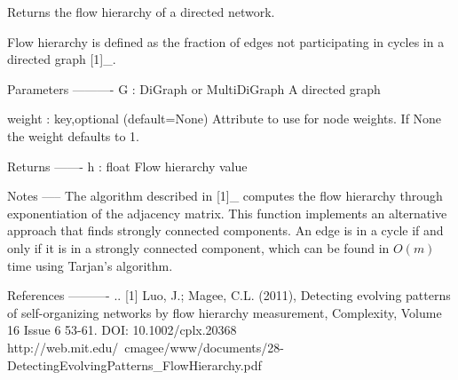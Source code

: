 \begin{DoxyVerb}Returns the flow hierarchy of a directed network.

Flow hierarchy is defined as the fraction of edges not participating
in cycles in a directed graph [1]_.

Parameters
----------
G : DiGraph or MultiDiGraph
   A directed graph

weight : key,optional (default=None)
   Attribute to use for node weights. If None the weight defaults to 1.

Returns
-------
h : float
   Flow hierarchy value

Notes
-----
The algorithm described in [1]_ computes the flow hierarchy through
exponentiation of the adjacency matrix.  This function implements an
alternative approach that finds strongly connected components.
An edge is in a cycle if and only if it is in a strongly connected
component, which can be found in $O(m)$ time using Tarjan's algorithm.

References
----------
.. [1] Luo, J.; Magee, C.L. (2011),
   Detecting evolving patterns of self-organizing networks by flow
   hierarchy measurement, Complexity, Volume 16 Issue 6 53-61.
   DOI: 10.1002/cplx.20368
   http://web.mit.edu/~cmagee/www/documents/28-DetectingEvolvingPatterns_FlowHierarchy.pdf
\end{DoxyVerb}
 